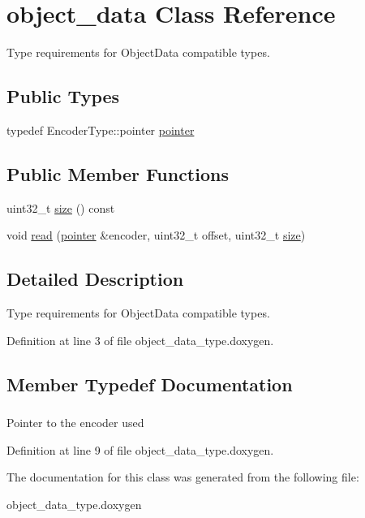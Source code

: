 \hypertarget{classobject__data}{\section{object\-\_\-data Class Reference}
\label{classobject__data}
}


Type requirements for Object\-Data compatible types.  


\subsection*{Public Types}
\begin{DoxyCompactItemize}
\item 
typedef Encoder\-Type\-::pointer \hyperlink{classobject__data_adb587f2766ca6bafe6658e115af97244}{pointer}
\end{DoxyCompactItemize}
\subsection*{Public Member Functions}
\begin{DoxyCompactItemize}
\item 
uint32\-\_\-t \hyperlink{group__object__data__type_gafcccd13382edeea01629744f28f86984}{size} () const 
\item 
void \hyperlink{group__object__data__type_ga70e0d8af81b20eb6b4e9818efd2c1502}{read} (\hyperlink{classobject__data_adb587f2766ca6bafe6658e115af97244}{pointer} \&encoder, uint32\-\_\-t offset, uint32\-\_\-t \hyperlink{group__object__data__type_gafcccd13382edeea01629744f28f86984}{size})
\end{DoxyCompactItemize}


\subsection{Detailed Description}
Type requirements for Object\-Data compatible types. 

Definition at line 3 of file object\-\_\-data\-\_\-type.\-doxygen.



\subsection{Member Typedef Documentation}
\hypertarget{classobject__data_adb587f2766ca6bafe6658e115af97244}{
\subsubsection[{pointer}]{}}\label{classobject__data_adb587f2766ca6bafe6658e115af97244}
Pointer to the encoder used 

Definition at line 9 of file object\-\_\-data\-\_\-type.\-doxygen.



The documentation for this class was generated from the following file\-:\begin{DoxyCompactItemize}
\item 
object\-\_\-data\-\_\-type.\-doxygen\end{DoxyCompactItemize}
